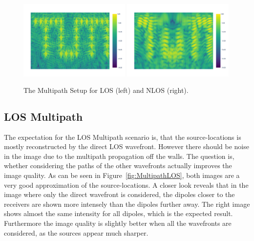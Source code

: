 \begin{figure}[ht]
    \centering
    \includegraphics[page=3, width=0.49\textwidth]{figures/multipath_los_combined.pdf}
    \includegraphics[page=3, width=0.49\textwidth]{figures/multipath_nlos_combined.pdf}
    \caption{The Multipath Setup for LOS (left) and NLOS (right).}\label{fig:MultipathNLOS_setup}
\end{figure}

\subsection{LOS Multipath}
The expectation for the LOS Multipath scenario is, that the source-locations is mostly reconstructed by the direct LOS wavefront.
However there should be noise in the image due to the multipath propagation off the walls.
The question is, whether considering the paths of the other wavefronts actually improves the image quality.
As can be seen in Figure~\ref{fig:MultipathLOS}, both images are a very good approximation of the source-locations.
A closer look reveals that in the image where only the direct wavefront is considered, the dipoles closer to the receivers are shown more intensely than the dipoles further away.
The right image shows almost the same intensity for all dipoles, which is the expected result.
Furthermore the image quality is slightly better when all the wavefronts are considered, as the sources appear much sharper.

